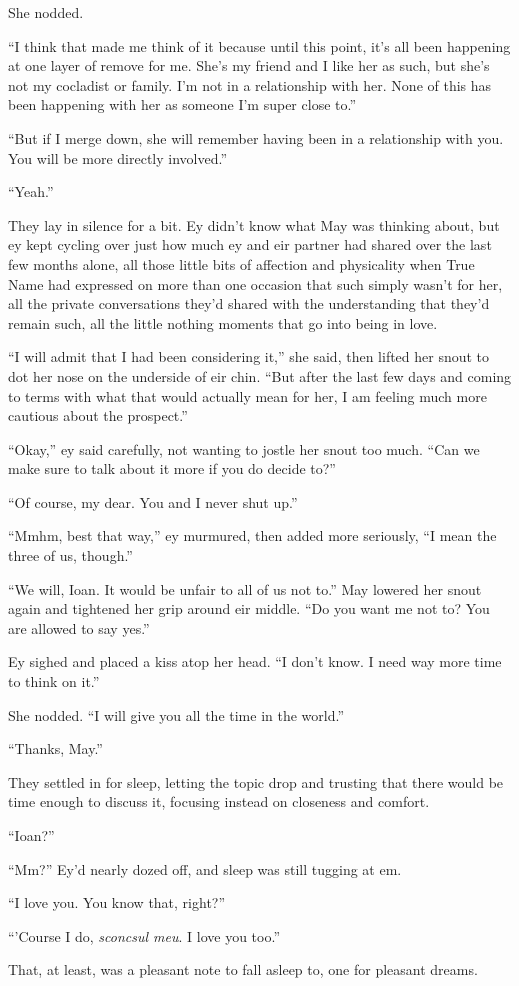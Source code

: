 She nodded.

``I think that made me think of it because until this point, it's all been happening at one layer of remove for me. She's my friend and I like her as such, but she's not my cocladist or family. I'm not in a relationship with her. None of this has been happening with her as someone I'm super close to.''

``But if I merge down, she will remember having been in a relationship with you. You will be more directly involved.''

``Yeah.''

They lay in silence for a bit. Ey didn't know what May was thinking about, but ey kept cycling over just how much ey and eir partner had shared over the last few months alone, all those little bits of affection and physicality when True Name had expressed on more than one occasion that such simply wasn't for her, all the private conversations they'd shared with the understanding that they'd remain such, all the little nothing moments that go into being in love.

``I will admit that I had been considering it,'' she said, then lifted her snout to dot her nose on the underside of eir chin. ``But after the last few days and coming to terms with what that would actually mean for her, I am feeling much more cautious about the prospect.''

``Okay,'' ey said carefully, not wanting to jostle her snout too much. ``Can we make sure to talk about it more if you do decide to?''

``Of course, my dear. You and I never shut up.''

``Mmhm, best that way,'' ey murmured, then added more seriously, ``I mean the three of us, though.''

``We will, Ioan. It would be unfair to all of us not to.'' May lowered her snout again and tightened her grip around eir middle. ``Do you want me not to? You are allowed to say yes.''

Ey sighed and placed a kiss atop her head. ``I don't know. I need way more time to think on it.''

She nodded. ``I will give you all the time in the world.''

``Thanks, May.''

They settled in for sleep, letting the topic drop and trusting that there would be time enough to discuss it, focusing instead on closeness and comfort.

``Ioan?''

``Mm?'' Ey'd nearly dozed off, and sleep was still tugging at em.

``I love you. You know that, right?''

``'Course I do, \emph{sconcsul meu}. I love you too.''

That, at least, was a pleasant note to fall asleep to, one for pleasant dreams.
